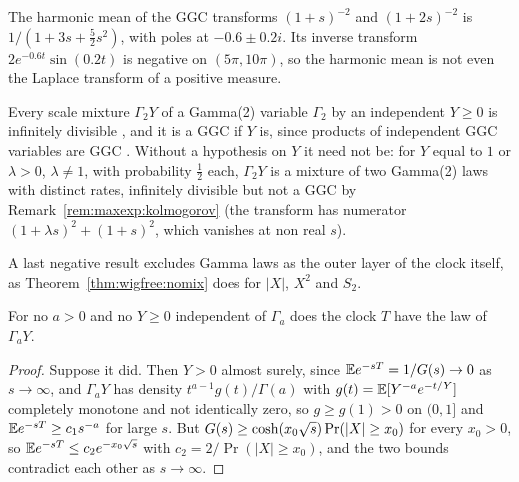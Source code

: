 \begin{example}\label{xg:ex:harm}
The harmonic mean of the GGC transforms $(1+s)^{-2}$ and $(1+2s)^{-2}$ is $1/(1+3s+\frac52s^2)$, with poles at $-0.6\pm0.2i$. Its inverse transform $2e^{-0.6t}\sin(0.2t)$ is negative on $(5\pi,10\pi)$, so the harmonic mean is not even the Laplace transform of a positive measure.
\end{example}

\begin{example}\label{xg:ex:g2}
Every scale mixture $\Gamma_2Y$ of a Gamma(2) variable $\Gamma_2$ by an independent $Y\ge0$ is infinitely divisible \cite{Kristiansen94}, and it is a GGC if $Y$ is, since products of independent GGC variables are GGC \cite{Bond2015}. Without a hypothesis on $Y$ it need not be: for $Y$ equal to $1$ or $\lambda>0$, $\lambda\ne1$, with probability $\frac12$ each, $\Gamma_2Y$ is a mixture of two Gamma(2) laws with distinct rates, infinitely divisible but not a GGC by Remark~\ref{rem:maxexp:kolmogorov} (the transform has numerator $(1+\lambda s)^2+(1+s)^2$, which vanishes at non real $s$).
\end{example}

A last negative result excludes Gamma laws as the outer layer of the clock itself, as Theorem~\ref{thm:wigfree:nomix} does for $|X|$, $X^2$ and $S_2$.

\begin{theorem}\label{xg:thm:nogamma}
For no $a>0$ and no $Y\ge0$ independent of $\Gamma_a$ does the clock $T$ have the law of $\Gamma_aY$.
\end{theorem}

\begin{proof}
Suppose it did. Then $Y>0$ almost surely, since $\mathbb{E} e^{-sT}=1/G(s)\to0$ as $s\to\infty$, and $\Gamma_aY$ has density $t^{a-1}g(t)/\Gamma(a)$ with $g(t)=\mathbb{E}[Y^{-a}e^{-t/Y}]$ completely monotone and not identically zero, so $g\ge g(1)>0$ on $(0,1]$ and $\mathbb{E} e^{-sT}\ge c_1s^{-a}$ for large $s$. But $G(s)\ge\cosh(x_0\sqrt{s})\Pr(|X|\ge x_0)$ for every $x_0>0$, so $\mathbb{E} e^{-sT}\le c_2e^{-x_0\sqrt{s}}$ with $c_2=2/\Pr(|X|\ge x_0)$, and the two bounds contradict each other as $s\to\infty$.
\end{proof}
